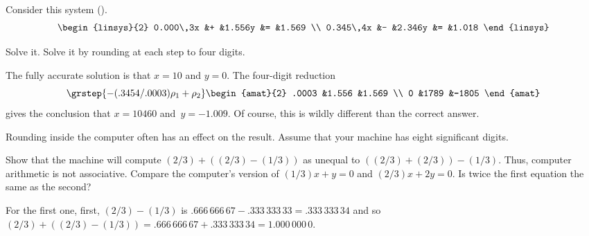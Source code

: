 \begin{exercises}
\begin{answer}
    \end{answer}
  \item 
    Consider this system (\cite{Rice}).
    \begin{equation*}
      \begin{linsys}{2}
        0.000\,3x  &+  &1.556y  &=  &1.569 \\
        0.345\,4x  &-  &2.346y  &=  &1.018
      \end{linsys}
    \end{equation*}
    \begin{exparts*}
      \partsitem Solve it.
      \partsitem Solve it by
         rounding at each step to four digits. 
    \end{exparts*}
    \begin{answer}
      \begin{exparts}
        \partsitem The fully accurate solution is that $x=10$ and $y=0$.
        \partsitem The four-digit reduction
          \begin{equation*}
            \grstep{-(.3454/.0003)\rho_1+\rho_2}
            \begin{amat}{2}
              .0003  &1.556  &1.569  \\
              0      &1789   &-1805
            \end{amat}
          \end{equation*}
          gives the conclusion that $x=10460$ and~$y=-1.009$. 
          Of course, this is wildly different than the correct answer.
      \end{exparts}
    \end{answer}
  \item 
    Rounding inside the computer often has an effect on the result.
    Assume that your machine has eight significant digits.
    \begin{exparts}
      \partsitem Show that the machine will compute 
         $(2/3)+((2/3)-(1/3))$ as unequal to $((2/3)+(2/3))-(1/3)$.
         Thus, computer arithmetic is not associative.
      \partsitem Compare the computer's version of $(1/3)x+y=0$
        and $(2/3)x+2y=0$.
        Is twice the first equation the same as the second?
    \end{exparts}
    \begin{answer}
      \begin{exparts}
        \partsitem For the first one, first, $(2/3)-(1/3)$ is 
          $.666\,666\,67-.333\,333\,33=.333\,333\,34$
          and so 
          $(2/3)+((2/3)-(1/3))=.666\,666\,67+.333\,333\,34=1.000\,000\,0$.


\end{exparts}
\end{answer}
\end{exercises}
